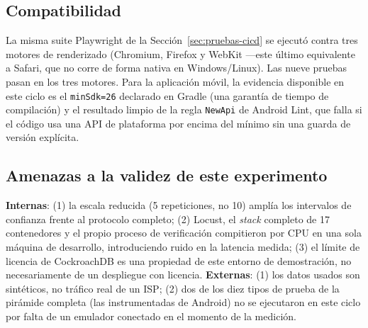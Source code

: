 \subsection{Compatibilidad}

La misma suite Playwright de la Sección~\ref{sec:pruebas-cicd} se ejecutó contra tres motores de
renderizado (Chromium, Firefox y WebKit —este último equivalente a Safari, que no corre de forma
nativa en Windows/Linux). Las nueve pruebas pasan en los tres motores. Para la aplicación móvil,
la evidencia disponible en este ciclo es el \texttt{minSdk=26} declarado en Gradle (una garantía
de tiempo de compilación) y el resultado limpio de la regla \texttt{NewApi} de Android
Lint, que falla si el código usa una API de plataforma por encima del mínimo sin una guarda de
versión explícita.

\subsection{Amenazas a la validez de este experimento}

\textbf{Internas}: (1) la escala reducida (5 repeticiones, no 10) amplía los intervalos de
confianza frente al protocolo completo; (2) Locust, el \emph{stack} completo de 17 contenedores y
el propio proceso de verificación compitieron por CPU en una sola máquina de desarrollo,
introduciendo ruido en la latencia medida; (3) el límite de licencia de CockroachDB es una
propiedad de este entorno de demostración, no necesariamente de un despliegue con licencia.
\textbf{Externas}: (1) los datos usados son sintéticos, no tráfico real de un ISP; (2) dos de los
diez tipos de prueba de la pirámide completa (las instrumentadas de Android) no se ejecutaron en
este ciclo por falta de un emulador conectado en el momento de la medición.
